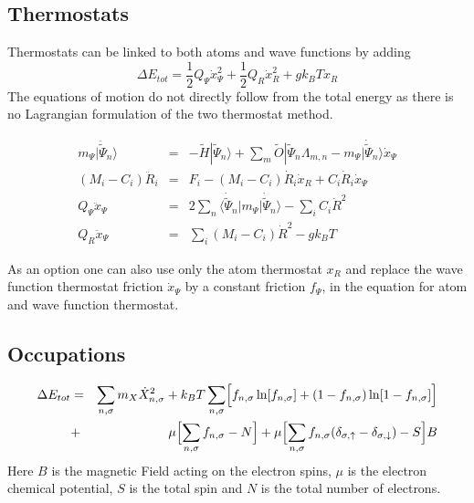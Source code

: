 \documentclass[final,12pt]{article}
\begin{document}
{%
\subsection{Thermostats}
Thermostats can be linked to both atoms and wave functions by adding
\begin{equation}
\Delta E_{tot}=\frac{1}{2}Q_\Psi\dot{x}_\Psi^2+\frac{1}{2}Q_R\dot{x}_R^2+gk_BT x_R
\end{equation}
The equations of motion do not directly follow from the total energy
as there is no Lagrangian formulation of the two thermostat method.

\begin{eqnarray*}
m_\Psi|\ddot{\tilde\Psi}_n\rangle&=&-\tilde{H}|\tilde\Psi_n\rangle+
\sum_m\tilde{O}|\tilde\Psi_n\Lambda_{m,n}
-m_\Psi|\dot{\tilde\Psi}_n\rangle \dot{x}_\Psi
\\
(M_i-C_i)\ddot{R}_i&=&F_i-(M_i-C_i)\dot{R}_i\dot{x}_R
+C_i\dot{R}_i\dot{x}_\Psi 
\\
Q_\Psi\ddot{x}_\Psi&=&2\sum_n
\langle\dot{\tilde\Psi}_n|m_\Psi|\dot{\tilde\Psi}_n\rangle 
-\sum_i C_i\dot{R}^2
\\
Q_R\ddot{x}_\Psi&=& \sum_i (M_i-C_i)\dot{R}^2-gk_BT
\end{eqnarray*}

As an option one can also use only the atom thermostat $x_R$ and
replace the wave function thermostat friction $\dot{x}_\Psi$ by a
constant friction $f_\Psi$, in the equation for atom and wave function
thermostat.

\subsection{Occupations}
\begin{eqnarray*}
\Delta E_{tot}&=&\sum_{n,\sigma}m_X\dot{X}_{n,\sigma}^2+k_BT\sum_{n,\sigma}
\Bigl[f_{n,\sigma}\ln[f_{n,\sigma}]+(1-f_{n,\sigma})\ln[1-f_{n,\sigma}]\Bigr]
\\
&+&\mu\Bigl[\sum_{n,\sigma}f_{n,\sigma}-N\Bigr]
+\mu\Bigl[\sum_{n,\sigma}f_{n,\sigma}
(\delta_{\sigma,\uparrow}-\delta_{\sigma,\downarrow})-S\Bigr]B
\end{eqnarray*}
Here $B$ is the magnetic Field acting on the electron spins, $\mu$ is
the electron chemical potential, $S$ is the total spin and $N$ is the
total number of electrons.

}
\end{document}
